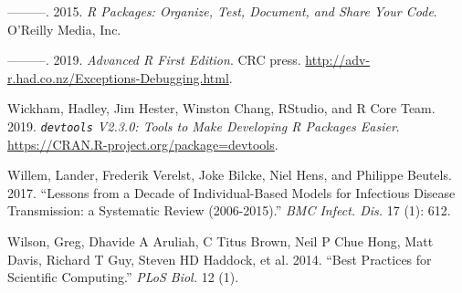 \documentclass[
]{article}
\begin{document}
\leavevmode\hypertarget{ref-wickham2015r}{}%
---------. 2015. \emph{R Packages: Organize, Test, Document, and Share Your Code}. O'Reilly Media, Inc.

\leavevmode\hypertarget{ref-wickham2019advanced}{}%
---------. 2019. \emph{Advanced R First Edition}. CRC press. \url{http://adv-r.had.co.nz/Exceptions-Debugging.html}.

\leavevmode\hypertarget{ref-devtools}{}%
Wickham, Hadley, Jim Hester, Winston Chang, RStudio, and R Core Team. 2019. \emph{\texttt{devtools} V2.3.0: Tools to Make Developing R Packages Easier}. \url{https://CRAN.R-project.org/package=devtools}.

\leavevmode\hypertarget{ref-willem2017lessons}{}%
Willem, Lander, Frederik Verelst, Joke Bilcke, Niel Hens, and Philippe Beutels. 2017. ``Lessons from a Decade of Individual-Based Models for Infectious Disease Transmission: a Systematic Review (2006-2015).'' \emph{BMC Infect. Dis.} 17 (1): 612.

\leavevmode\hypertarget{ref-wilson2014best}{}%
Wilson, Greg, Dhavide A Aruliah, C Titus Brown, Neil P Chue Hong, Matt Davis, Richard T Guy, Steven HD Haddock, et al. 2014. ``Best Practices for Scientific Computing.'' \emph{PLoS Biol.} 12 (1).
\end{document}
